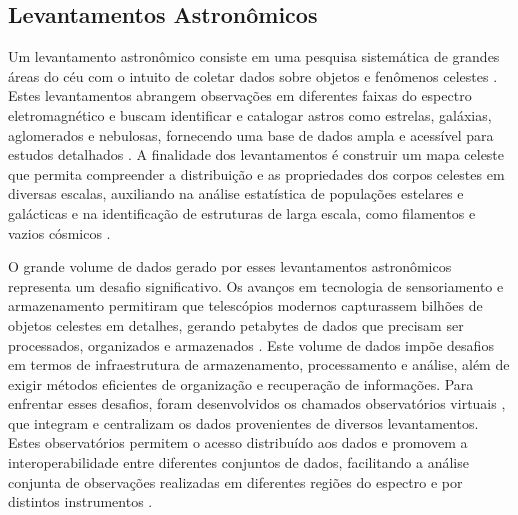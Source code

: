 




\subsection{Levantamentos Astronômicos}
\label{sec:surveys}
Um levantamento astronômico consiste em uma pesquisa sistemática de grandes áreas do céu com o intuito de coletar dados sobre objetos e fenômenos celestes \cite[p. 40-42]{extragalactic-astronomy-book}. Estes levantamentos abrangem observações em diferentes faixas do espectro eletromagnético e buscam identificar e catalogar astros como estrelas, galáxias, aglomerados e nebulosas, fornecendo uma base de dados ampla e acessível para estudos detalhados \cite{astronomical-survey}. A finalidade dos levantamentos é construir um mapa celeste que permita compreender a distribuição e as propriedades dos corpos celestes em diversas escalas, auxiliando na análise estatística de populações estelares e galácticas e na identificação de estruturas de larga escala, como filamentos e vazios cósmicos \cite{bahcall1995,baleisis1998,jarrett2004}.

O grande volume de dados gerado por esses levantamentos astronômicos representa um desafio significativo. Os avanços em tecnologia de sensoriamento e armazenamento permitiram que telescópios modernos capturassem bilhões de objetos celestes em detalhes, gerando petabytes de dados que precisam ser processados, organizados e armazenados \cite{szalay2000,graefe1993}. Este volume de dados impõe desafios em termos de infraestrutura de armazenamento, processamento e análise, além de exigir métodos eficientes de organização e recuperação de informações. Para enfrentar esses desafios, foram desenvolvidos os chamados observatórios virtuais \cite{ivoa}, que integram e centralizam os dados provenientes de diversos levantamentos. Estes observatórios permitem o acesso distribuído aos dados e promovem a interoperabilidade entre diferentes conjuntos de dados, facilitando a análise conjunta de observações realizadas em diferentes regiões do espectro e por distintos instrumentos \cite{sciserver}.

